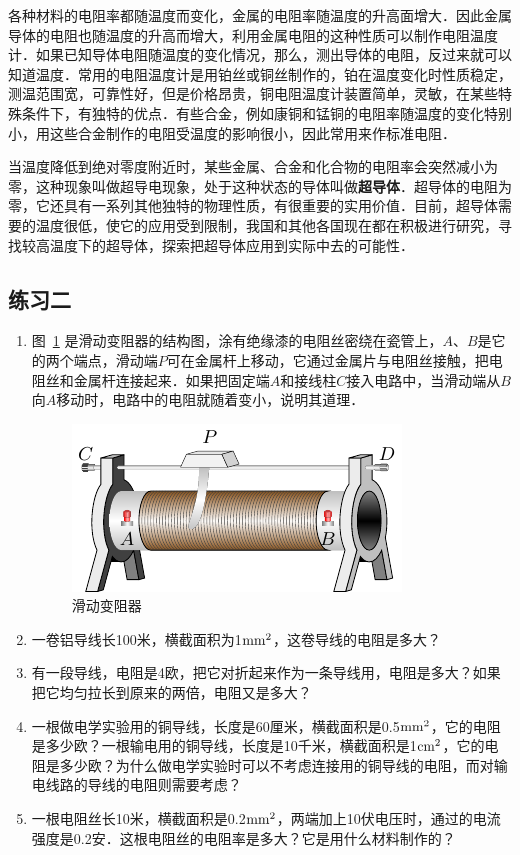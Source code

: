 各种材料的电阻率都随温度而变化，金属的电阻率随温度的升高面增大．因此金属导体的电阻也随温度的升高而增大，利用金属电阻的这种性质可以制作电阻温度计．如果已知导体电阻随温度的变化情况，那么，测出导体的电阻，反过来就可以知道温度．常用的电阻温度计是用铂丝或铜丝制作的，铂在温度变化时性质稳定，测温范围宽，可靠性好，但是价格昂贵，铜电阻温度计装置简单，灵敏，在某些特殊条件下，有独特的优点．有些合金，例如康铜和锰铜的电阻率随温度的变化特别小，用这些合金制作的电阻受温度的影响很小，因此常用来作标准电阻．

当温度降低到绝对零度附近时，某些金属、合金和化合物的电阻率会突然减小为零，这种现象叫做超导电现象，处于这种状态的导体叫做\textbf{超导体}．超导体的电阻为零，它还具有一系列其他独特的物理性质，有很重要的实用价值．目前，超导体需要的温度很低，使它的应用受到限制，我国和其他各国现在都在积极进行研究，寻找较高温度下的超导体，探索把超导体应用到实际中去的可能性．

\subsection*{练习二}

\begin{enumerate}
    \item 图~\ref{fig_B_7-4} 是滑动变阻器的结构图，涂有绝缘漆的电阻丝密绕在瓷管上，$A$、$B$是它的两个端点，滑动端$P$可在金属杆上移动，它通过金属片与电阻丝接触，把电阻丝和金属杆连接起来．如果把固定端$A$和接线柱$C$接入电路中，当滑动端从$B$向$A$移动时，电路中的电阻就随着变小，说明其道理．
    \begin{figure}[htbp]
        \centering
        \includegraphics{fig/B/7-4.pdf}
        \caption{滑动变阻器}\label{fig_B_7-4}
    \end{figure}
    \item 一卷铝导线长100米，横截面积为1${\rm mm}^2$，这卷导线的电阻是多大？
    \item 有一段导线，电阻是4欧，把它对折起来作为一条导线用，电阻是多大？如果把它均匀拉长到原来的两倍，电阻又是多大？
    \item 一根做电学实验用的铜导线，长度是60厘米，横截面积是0.5${\rm mm}^2$，它的电阻是多少欧？一根输电用的铜导线，长度是10千米，横截面积是1${\rm cm}^2$，它的电阻是多少欧？为什么做电学实验时可以不考虑连接用的铜导线的电阻，而对输电线路的导线的电阻则需要考虑？
    \item 一根电阻丝长10米，横截面积是0.2${\rm mm}^2$，两端加上10伏电压时，通过的电流强度是0.2安．这根电阻丝的电阻率是多大？它是用什么材料制作的？
\end{enumerate}

